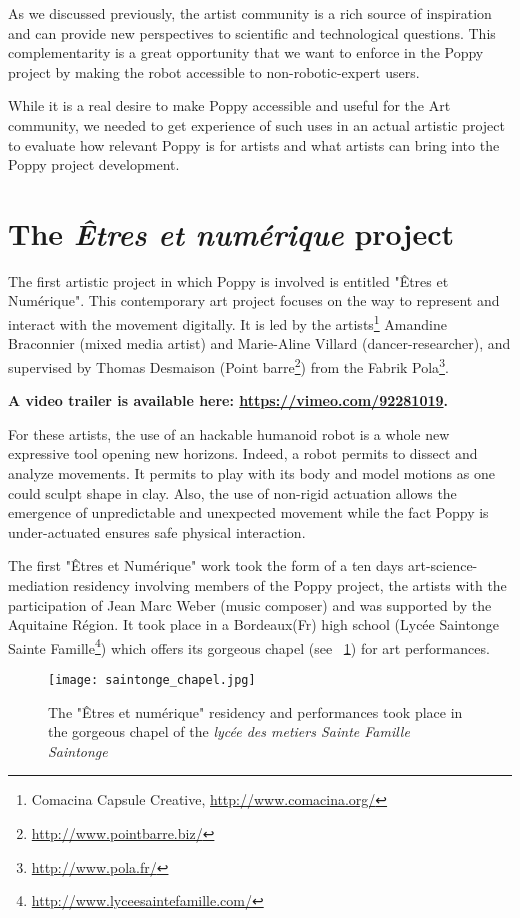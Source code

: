 As we discussed previously, the artist community is a rich source of inspiration and can provide new perspectives to scientific and technological questions. This complementarity is a great opportunity that we want to enforce in the Poppy project by making the robot accessible to non-robotic-expert users.

While it is a real desire to make Poppy accessible and useful for the Art community, we needed to get experience of such uses in an actual artistic project to evaluate how relevant Poppy is for artists and what artists can bring into the Poppy project development.

\section{The \emph{Êtres et numérique} project} %

The first artistic project in which Poppy is involved is entitled "Êtres et Numérique". This contemporary art project focuses on the way to represent and interact with the movement digitally. It is led by the artists\footnote{Comacina Capsule Creative, \url{http://www.comacina.org/}} Amandine Braconnier (mixed media artist) and Marie-Aline Villard (dancer-researcher), and supervised by Thomas Desmaison (Point barre\footnote{\url{http://www.pointbarre.biz/}}) from the Fabrik Pola\footnote{\url{http://www.pola.fr/}}.

\textbf{A video trailer is available here: \url{https://vimeo.com/92281019}.}

For these artists, the use of an hackable humanoid robot is a whole new expressive tool opening new horizons. Indeed, a robot permits to dissect and analyze movements. It permits to play with its body and model motions as one could sculpt shape in clay. Also, the use of non-rigid actuation allows the emergence of unpredictable and unexpected movement while the fact Poppy is under-actuated ensures safe physical interaction.


The first "Êtres et Numérique" work took the form of a ten days art-science-mediation residency involving members of the Poppy project, the artists with the participation of Jean Marc Weber (music composer) and was supported by the Aquitaine Région. It took place in a Bordeaux(Fr) high school (Lycée Saintonge Sainte Famille\footnote{\url{http://www.lyceesaintefamille.com/}}) which offers its gorgeous chapel (see \figurename~\ref{fig:saintonge_chapel}) for art performances.

\begin{figure}[t]
    \begin{center}
        \texttt{[image: saintonge\_chapel.jpg]}
    \end{center}
    \caption{The "Êtres et numérique" residency and performances took place in the gorgeous chapel of the \emph{lycée des metiers Sainte Famille Saintonge}}
    \label{fig:saintonge_chapel}
\end{figure}


